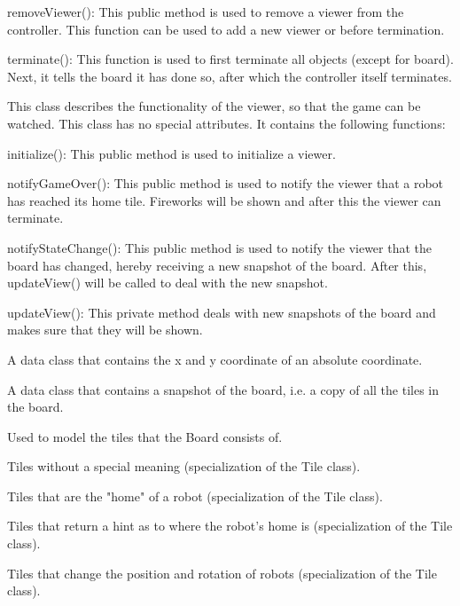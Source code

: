 \begin{description}
\begin{description}
            \item removeViewer(): This public method is used to remove a viewer from the controller. This function can be used to add a new viewer or before termination.
            \item terminate(): This function is used to first terminate all objects (except for board). Next, it tells the board it has done so, after which the controller itself terminates.
        \end{description}
        \item[Viewer] This class describes the functionality of the viewer, so that the game can be watched. This class has no special attributes. It contains the following functions:
        \begin{description}
            \item initialize(): This public method is used to initialize a viewer.
            \item notifyGameOver(): This public method is used to notify the viewer that a robot has reached its home tile. Fireworks will be shown and after this the viewer can terminate.
            \item notifyStateChange(): This public method is used to notify the viewer that the board has changed, hereby receiving a new snapshot of the board. After this, updateView() will be called to deal with the new snapshot.
            \item updateView(): This private method deals with new snapshots of the board and makes sure that they will be shown.
        \end{description}
        \item[AbsoluteCoord] A data class that contains the x and y coordinate of an absolute coordinate.
		\item[BoardSnapshot] A data class that contains a snapshot of the board, i.e. a copy of all the tiles in the board.
		\item[Tile] Used to model the tiles that the Board consists of.
		\item[NormalTile] Tiles without a special meaning (specialization of the Tile class).
		\item[HomeTile] Tiles that are the "home" of a robot (specialization of the Tile class).
		\item[HintTile] Tiles that return a hint as to where the robot's home is (specialization of the Tile class).
		\item[ConveyorTile] Tiles that change the position and rotation of robots (specialization of the Tile class).

\end{description}

